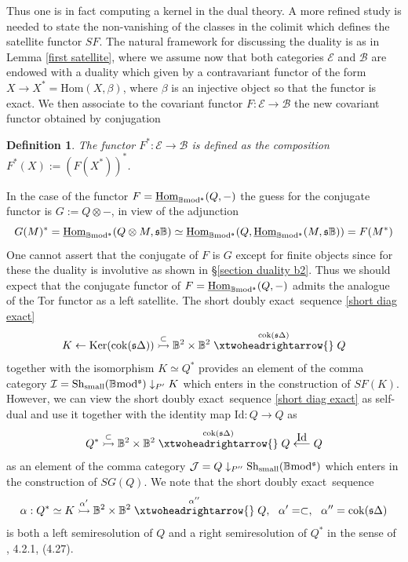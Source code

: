 \documentclass[12pt]{article}
\newtheorem{defn}[thm]{Definition}
\def\Hom{{\rm Hom}}
\def\Homi{{\underline{\rm Hom}}}
\def\id{{\rm id}}
\def\scoker{{\rm cok}}
\def\B{{\mathbb B}}
\def\exxx{{doubly exact}~}
\def\cB{{\mathcal B}}
\def\cE{{\mathcal E}}
\def\cI{{\mathcal I}}
\def\cJ{{\mathcal J}}
\def\id{{\mbox{Id}}}
\def\ker{{\mbox{Ker}}}
\def\Hom {{\mbox{Hom}}}
\def\sequ{{\rm Sh}}
\def\yb{\mathfrak{s}}
\def\b2{{\rm \B mod^{\mathfrak s}}}
\begin{document}
Thus one is in fact computing a kernel in the dual theory. A more refined study is needed to state the non-vanishing of the classes in the colimit which defines the satellite functor $SF$. The natural framework for discussing the duality is as in Lemma \ref{first satellite}, where we assume now that both categories $\cE$ and $\cB$ are endowed with a duality which given by a contravariant functor of the form $X\longrightarrow X^*=\Hom(X,\beta)$, where $\beta$ is an injective object so that the functor is exact. We then associate to the covariant functor $F:\cE\longrightarrow \cB$  the new covariant functor obtained by conjugation
 \begin{defn}\label{conjugate functor}  The functor $F^*:\cE\longrightarrow \cB$ is defined as  the composition $F^*(X):=(F(X^*))^*$.
 \end{defn} 
 In the case of the functor $F=\Homi_\b2(Q,-)$ the guess for the conjugate functor is $G:=Q\otimes -$, in view of the adjunction
 \begin{equation}\label{hom tensor}
 G(M)^*=\Homi_\b2(Q\otimes M,\yb\B)\simeq \Homi_\b2(Q,\Homi_\b2(M,\yb\B))=F(M^*)
 \end{equation}
One cannot assert that the conjugate of $F$ is $G$ except for finite objects since for these  the duality is involutive  as shown in \S \ref{section duality b2}. Thus we should expect that the conjugate functor of $F=\Homi_\b2(Q,-)$ admits the analogue of the Tor functor as a left satellite. The short \exxx sequence \eqref{short diag exact}
	$$K\leftarrow \ker(\scoker(\yb\Delta))\stackrel{\subset}{\rightarrowtail} \B^2\times \B^2\stackrel{\scoker(\yb\Delta)}{\xtwoheadrightarrow{}}Q$$ together with the isomorphism  $K\simeq Q^*$ provides an element of the comma category $\cI=\sequ_{\rm small}(\b2)\downarrow_{P'} K$ which enters in the construction of $SF(K)$. However, we can view the short \exxx sequence \eqref{short diag exact} as self-dual and use it together with the identity map $\id:Q\to Q$ as
	$$
	Q^*\stackrel{\subset}{\rightarrowtail} \B^2\times \B^2\stackrel{\scoker(\yb\Delta)}{\xtwoheadrightarrow{}}Q\stackrel{\id}{\longleftarrow} Q
	$$
	as an element of the comma category $\cJ=Q\downarrow_{P''} \sequ_{\rm small}(\b2)$ 
	which enters in the construction of $SG(Q)$. We note that the short \exxx sequence 
	\begin{equation}\label{exact alpha}
		\alpha: Q^*\simeq K\stackrel{\alpha'}{\rightarrowtail} \B^2\times \B^2\stackrel{\alpha''}{\xtwoheadrightarrow{}}Q, \ \ \alpha'=\subset, \ \ \alpha''=\scoker(\yb\Delta)
	\end{equation}
	is both a left semiresolution of $Q$ and a right semiresolution of $Q^*$ in the sense of 
	\cite{gra1}, 4.2.1, (4.27).
	
\end{document}
